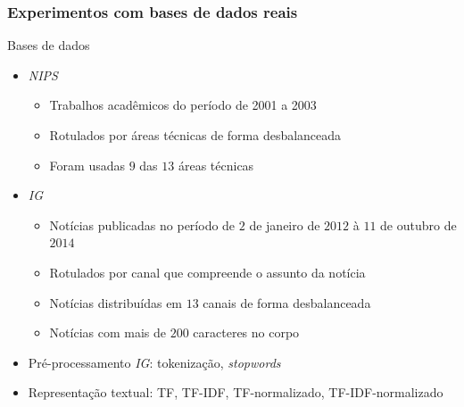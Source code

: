 \documentclass[10pt]{beamer}
\begin{document}

\begin{frame} [shrink=15]
\frametitle{Experimentos com bases de dados reais}

  Bases de dados
  \begin{itemize}
    \item \textit{NIPS}
    \begin{itemize}
      \item Trabalhos acadêmicos do período de 2001 a 2003
      \item Rotulados por áreas técnicas de forma desbalanceada
      \item Foram usadas $9$ das $13$ áreas técnicas
    \end{itemize}
    \item \textit{IG}
    \begin{itemize}
      \item Notícias publicadas no período de $2$ de janeiro de $2012$ à $11$ de outubro de $2014$
      \item Rotulados por canal que compreende o assunto da notícia
      \item Notícias distribuídas em $13$ canais de forma desbalanceada
      \item Notícias com mais de $200$ caracteres no corpo
    \end{itemize}
  \end{itemize}


  \begin{table}[h]
      \centering
  \end{table}

  \begin{itemize}
    \item Pré-processamento \textit{IG}: tokenização, \textit{stopwords}
    \item Representação textual: TF, TF-IDF, TF-normalizado, TF-IDF-normalizado
  \end{itemize}

\end{frame}
\end{document}
